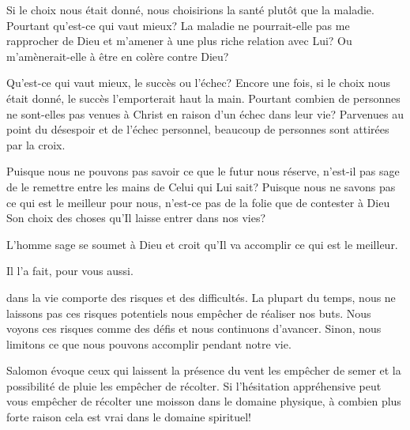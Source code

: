 
Si le choix nous était donné, nous choisirions la santé
 plutôt que la maladie. Pourtant qu'est-ce qui vaut mieux?
 La maladie ne pourrait-elle pas me rapprocher de Dieu
 et m'amener à une plus riche relation avec Lui?
 Ou m'amènerait-elle à être en colère contre Dieu? 

Qu'est-ce qui vaut mieux, le succès ou l'échec?
 Encore une fois, si le choix nous était donné,
 le succès l'emporterait haut la main.
 Pourtant combien de personnes ne sont-elles pas venues à Christ
 en raison d'un échec dans leur vie?
 Parvenues au point du désespoir et de l'échec personnel,
 beaucoup de personnes sont attirées par la croix. 

Puisque nous ne pouvons pas savoir ce que le futur nous réserve,
 n'est-il pas sage de le remettre entre les mains de Celui qui Lui sait?
 Puisque nous ne savons pas ce qui est le meilleur pour nous,
 n'est-ce pas de la folie que de contester à Dieu Son choix des choses
 qu'Il laisse entrer dans nos vies? 

L'homme sage se soumet à Dieu et croit qu'Il va accomplir
 ce qui est le meilleur. 

Il l'a fait, pour vous aussi.

\dvrule






 dans la vie
 comporte des risques et des difficultés.
 La plupart du temps, nous ne laissons pas ces risques potentiels
 nous empêcher de réaliser nos buts.
 Nous voyons ces risques comme des défis et nous continuons d'avancer.
 Sinon, nous limitons ce que nous pouvons accomplir pendant notre vie. 

Salomon évoque ceux qui laissent la présence du vent les empêcher
 de semer et la possibilité de pluie les empêcher de récolter.
 Si l'hésitation appréhensive peut vous empêcher de récolter
 une moisson dans le domaine physique, à combien plus forte raison
 cela est vrai dans le domaine spirituel! 

